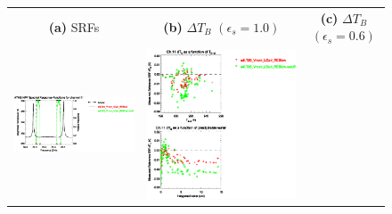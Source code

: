 \begin{figure}[H]
  \centering
  \begin{tabular}{c c c}
    \textsf{\textbf{(a)} SRFs} &
    \textsf{\textbf{(b)} $\Delta T_B$ $(\epsilon_s = 1.0)$} &
    \textsf{\textbf{(c)} $\Delta T_B$ $(\epsilon_s = 0.6)$} \\
    \includegraphics[bb=80 400 280 558,clip,scale=0.85]{graphics/srf/Rset/atms_npp.ch11.osrf.eps} &
    \includegraphics[bb=85 400 260 558,clip,scale=0.85]{graphics/dtb/Rset/e1.0_r0.0/atms_npp.ch11.dTb.eps} & 

\end{tabular}
\end{figure}

